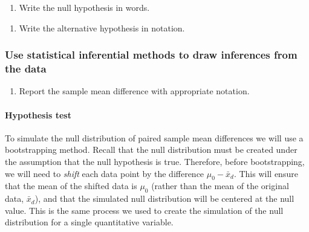 \documentclass[
]{report}
\providecommand{\tightlist}{%
  \setlength{\itemsep}{0pt}\setlength{\parskip}{0pt}}
\begin{document}
\begin{enumerate}
\def\labelenumi{\arabic{enumi}.}
\setcounter{enumi}{2}
\tightlist
\item
  Write the null hypothesis in words.
\end{enumerate}

\vspace{0.8in}

\begin{enumerate}
\def\labelenumi{\arabic{enumi}.}
\setcounter{enumi}{3}
\tightlist
\item
  Write the alternative hypothesis in notation.
\end{enumerate}

\vspace{0.3in}

\subsubsection*{Use statistical inferential methods to draw inferences from the data}\label{use-statistical-inferential-methods-to-draw-inferences-from-the-data}

\begin{enumerate}
\def\labelenumi{\arabic{enumi}.}
\setcounter{enumi}{4}
\tightlist
\item
  Report the sample mean difference with appropriate notation.
\end{enumerate}

\vspace{0.2in}

\paragraph*{Hypothesis test}\label{hypothesis-test}

To simulate the null distribution of paired sample mean differences we will use a bootstrapping method. Recall that the null distribution must be created under the assumption that the null hypothesis is true. Therefore, before bootstrapping, we will need to \emph{shift} each data point by the difference \(\mu_0 - \bar{x}_d\). This will ensure that the mean of the shifted data is \(\mu_0\) (rather than the mean of the original data, \(\bar{x}_d\)), and that the simulated null distribution will be centered at the null value. This is the same process we used to create the simulation of the null distribution for a single quantitative variable.
\end{document}
